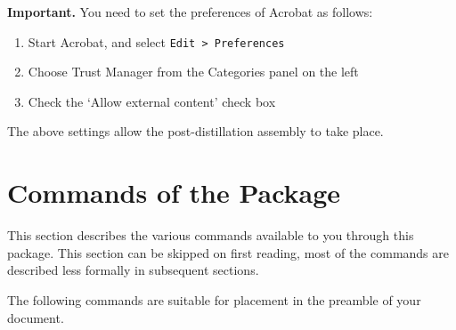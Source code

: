 \documentclass{article}
\begin{document}
\noindent\textbf{\color{red}Important.} You need to set the preferences of Acrobat as follows:
\begin{enumerate}
    \item Start Acrobat, and select \texttt{Edit > Preferences}
    \item Choose Trust Manager from the Categories panel on the left
    \item Check the `Allow external content' check box
\end{enumerate}
\noindent The above settings allow the post-distillation assembly to take place.

\section{Commands of the Package}

This section describes the various commands available to you through
this package. This section can be skipped on first reading, most of
the commands are described less formally in subsequent sections.

\newtopic The following commands are suitable for placement in the
preamble of your document.
\end{document}
